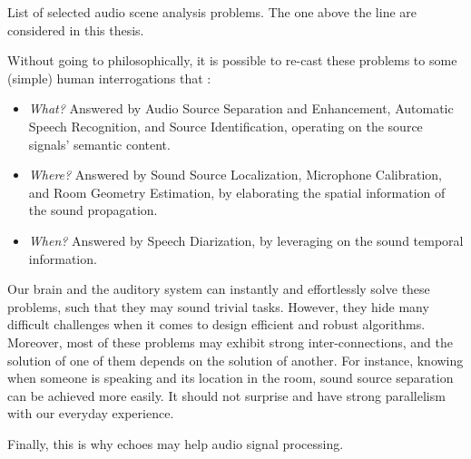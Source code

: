 \begin{table}[!h]

    \begin{fullwidth}
    \centering
    \small

    
    \caption{List of selected audio scene analysis problems. The one above the line are considered in this thesis.}
    \label{tab:processing:problems}

    \end{fullwidth}

\end{table}

\mynewline
Without going to philosophically, it is possible to re-cast these problems to some (simple) human interrogations that :
\begin{itemize}
    \item  \textit{What?} Answered by Audio Source Separation and Enhancement, Automatic Speech Recognition, and Source Identification, operating on the source signals' semantic content.
    \item  \textit{Where?} Answered by Sound Source Localization, Microphone Calibration, and Room Geometry Estimation, by elaborating the spatial information of the sound propagation.
    \item  \textit{When?} Answered by Speech Diarization, by leveraging on the sound temporal information.
\end{itemize}

\mynewline{}
Our brain and the auditory system can instantly and effortlessly solve these problems, such that they may sound trivial tasks.
However, they hide many difficult challenges when it comes to design efficient and robust algorithms.
Moreover, most of these problems may exhibit strong inter-connections, and the solution of one of them depends on the solution of another.
For instance, knowing when someone is speaking and its location in the room, sound source separation can be achieved more easily.
It should not surprise and have strong parallelism with our everyday experience.

\mynewline
Finally, this is why echoes may help audio signal processing.



